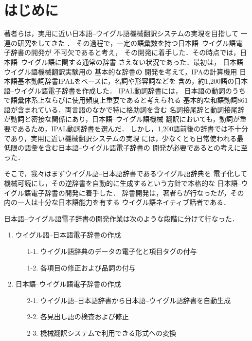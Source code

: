 \maketitle
\thispagestyle{empty}

\section{はじめに}
著者らは，実用に近い日本語--ウイグル語機械翻訳システムの実現を目指して
一連の研究をしてきた
\cite{NLC93,MSTHESIS,MUHPARAM,PRICAI94,MUH_OGA2001,OGAWA2000,MT_SUMMIT2001,MUH_NLT_2002}．
その過程で，一定の語彙数を持つ日本語--ウイグル語電子辞書の開発が
不可欠であると考え，
その開発に着手した．その時点では，日本語--ウイグル語に関する通常の辞書
さえない状況であった．最初は，
日本語--ウイグル語機械翻訳実験用の
基本的な辞書の
開発を考えて，IPAの計算機用
日本語基本動詞辞書IPAL\cite{IPAL}をベースに，名詞や形容詞などを
含め，約1,200語の日本語--ウイグル語電子辞書を作成した\cite{NLC93,MSTHESIS}．
IPAL動詞辞書には，
日本語の動詞のうちで語彙体系上ならびに使用頻度上重要であると考えられる
基本的な和語動詞861語が含まれている．両言語のなかで特に格助詞を含む
名詞接尾辞と動詞接尾辞が動詞と密接な関係にあり，日本語--ウイグル語機械
翻訳においても，動詞が重要であるため，IPAL動詞辞書を選んだ．
しかし，1,200語前後の辞書では不十分であり，実用に近い機械翻訳システムの実現
には，少なくとも日常使われる最低限の語彙を含む日本語--ウイグル語電子辞書の
開発が必要であるとの考えに至った．

そこで，我々はまずウイグル語--日本語辞書であるウイグル語辞典\cite{UJDIC}を
電子化して機械可読にし，その逆辞書を自動的に生成するという方針で本格的な
日本語--ウイグル語電子辞書の開発に着手した\cite{UJDICE,JUDICGEN}．
辞書開発は，著者らが行なったが，その内の一人は十分な日本語能力を有する
ウイグル語ネイティブ話者である．

日本語--ウイグル語電子辞書の開発作業は次のような段階に分けて行なった．\\

\begin{enumerate}
 \item ウイグル語--日本語電子辞書の作成
\begin{itemize}
 \item[1-1.] ウイグル語辞典\cite{UJDIC}のデータの電子化と項目タグの付与
 \item[1-2.] 各項目の修正および品詞の付与
\end{itemize}

 \item 日本語--ウイグル語電子辞書の作成
\begin{itemize}
 \item[2-1.] ウイグル語--日本語辞書から日本語--ウイグル語辞書を自動生成
 \item[2-2.] 各見出し語の検査および修正
 \item[2-3.] 機械翻訳システムで利用できる形式への変換
\end{itemize}       
\end{enumerate} 

